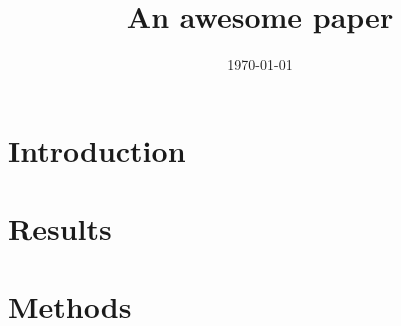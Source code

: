 \documentclass[12pt]{article} %
\def\figdir{figs}
\begin{document}

\title{An awesome paper} %
\date{\today}
\maketitle %

\section{Introduction}\label{sec:introduction} %



\section{Results}\label{sec:results} %



\section{Methods}\label{sec:methods} %


\printbibliography{}
    
\end{document}
